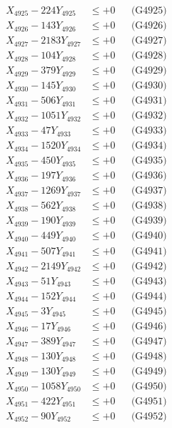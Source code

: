 \documentclass[a4paper,10pt]{article}
\begin{document}
{\begin{align}
X_{4925} - 224Y_{4925} &\leq +0 && \text{(G4925)} \\
X_{4926} - 143Y_{4926} &\leq +0 && \text{(G4926)} \\
X_{4927} - 2183Y_{4927} &\leq +0 && \text{(G4927)} \\
X_{4928} - 104Y_{4928} &\leq +0 && \text{(G4928)} \\
X_{4929} - 379Y_{4929} &\leq +0 && \text{(G4929)} \\
X_{4930} - 145Y_{4930} &\leq +0 && \text{(G4930)} \\
\allowbreak
X_{4931} - 506Y_{4931} &\leq +0 && \text{(G4931)} \\
X_{4932} - 1051Y_{4932} &\leq +0 && \text{(G4932)} \\
X_{4933} - 47Y_{4933} &\leq +0 && \text{(G4933)} \\
X_{4934} - 1520Y_{4934} &\leq +0 && \text{(G4934)} \\
X_{4935} - 450Y_{4935} &\leq +0 && \text{(G4935)} \\
X_{4936} - 197Y_{4936} &\leq +0 && \text{(G4936)} \\
X_{4937} - 1269Y_{4937} &\leq +0 && \text{(G4937)} \\
X_{4938} - 562Y_{4938} &\leq +0 && \text{(G4938)} \\
X_{4939} - 190Y_{4939} &\leq +0 && \text{(G4939)} \\
X_{4940} - 449Y_{4940} &\leq +0 && \text{(G4940)} \\
\allowbreak
X_{4941} - 507Y_{4941} &\leq +0 && \text{(G4941)} \\
X_{4942} - 2149Y_{4942} &\leq +0 && \text{(G4942)} \\
X_{4943} - 51Y_{4943} &\leq +0 && \text{(G4943)} \\
X_{4944} - 152Y_{4944} &\leq +0 && \text{(G4944)} \\
X_{4945} - 3Y_{4945} &\leq +0 && \text{(G4945)} \\
X_{4946} - 17Y_{4946} &\leq +0 && \text{(G4946)} \\
X_{4947} - 389Y_{4947} &\leq +0 && \text{(G4947)} \\
X_{4948} - 130Y_{4948} &\leq +0 && \text{(G4948)} \\
X_{4949} - 130Y_{4949} &\leq +0 && \text{(G4949)} \\
X_{4950} - 1058Y_{4950} &\leq +0 && \text{(G4950)} \\
\allowbreak
X_{4951} - 422Y_{4951} &\leq +0 && \text{(G4951)} \\
X_{4952} - 90Y_{4952} &\leq +0 && \text{(G4952)} \\

\end{align}}
\end{document}
